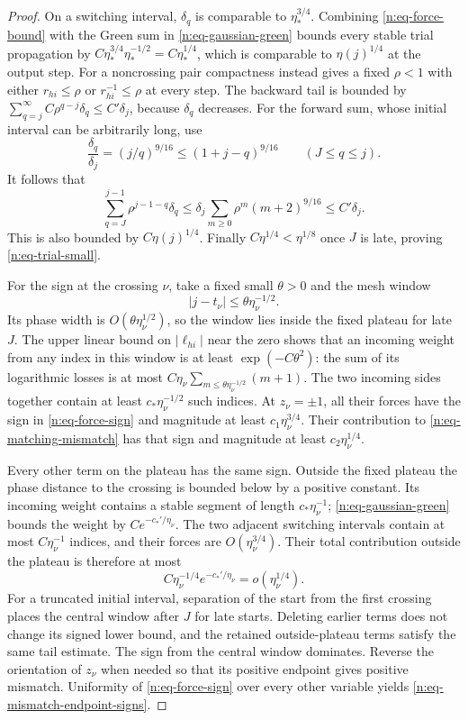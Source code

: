 \begin{proof}
On a switching interval, \(\delta_q\) is comparable to
\(\eta_*^{3/4}\).  Combining \eqref{n:eq-force-bound} with the Green sum
in \eqref{n:eq-gaussian-green} bounds every stable trial propagation by
\(C\eta_*^{3/4}\eta_*^{-1/2}=C\eta_*^{1/4}\), which is comparable to
\(\eta(j)^{1/4}\) at the output step.
For a noncrossing pair compactness instead gives a fixed \(\rho<1\) with
either \(r_{hi}\leq\rho\) or \(r_{hi}^{-1}\leq\rho\) at every step.
The backward tail is bounded by
\(\sum_{q=j}^{\infty}C\rho^{q-j}\delta_q\leq C'\delta_j\), because
\(\delta_q\) decreases.  For the forward sum, whose initial interval can
be arbitrarily long, use
\[
 \frac{\delta_q}{\delta_j}=(j/q)^{9/16}
 \leq(1+j-q)^{9/16}\qquad(J\leq q\leq j).
\]
It follows that
\[
 \sum_{q=J}^{j-1}\rho^{j-1-q}\delta_q
 \leq\delta_j\sum_{m\geq0}\rho^m(m+2)^{9/16}
 \leq C'\delta_j.
\]
This is also bounded by \(C\eta(j)^{1/4}\).
Finally \(C\eta^{1/4}<\eta^{1/8}\) once \(J\) is late, proving
\eqref{n:eq-trial-small}.

For the sign at the crossing \(\nu\), take a fixed small \(\theta>0\) and
the mesh window
\[
 |j-t_\nu|\leq\theta\eta_\nu^{-1/2}.
\]
Its phase width is \(O(\theta\eta_\nu^{1/2})\), so the window lies inside
the fixed plateau for late \(J\).  The upper linear bound on
\(|\ell_{hi}|\) near the zero shows that an incoming weight from any
index in this window is at least \(\exp(-C\theta^2)\): the sum of its
logarithmic losses is at most \(C\eta_\nu\sum_{m\leq
\theta\eta_\nu^{-1/2}}(m+1)\).  The two incoming sides together contain
at least \(c_*\eta_\nu^{-1/2}\) such indices.  At \(z_\nu=\pm1\), all their
forces have the sign in \eqref{n:eq-force-sign} and magnitude at least
\(c_1\eta_\nu^{3/4}\).  Their contribution to
\eqref{n:eq-matching-mismatch} has that sign and magnitude at least
\(c_2\eta_\nu^{1/4}\).

Every other term on the plateau has the same sign.  Outside the fixed
plateau the phase distance to the crossing is bounded below by a positive
constant.  Its incoming weight contains a stable segment of length
\(c_*\eta_\nu^{-1}\); \eqref{n:eq-gaussian-green} bounds the weight by
\(C e^{-c_*'/\eta_\nu}\).  The two adjacent switching intervals contain at
most \(C\eta_\nu^{-1}\) indices, and their forces are
\(O(\eta_\nu^{3/4})\).  Their total contribution outside the plateau is
therefore at most
\[
 C\eta_\nu^{-1/4}e^{-c_*'/\eta_\nu}
   =o(\eta_\nu^{1/4}).
\]
For a truncated initial interval, separation of the start from the first
crossing places the central window after \(J\) for late starts.  Deleting
earlier terms does not change its signed lower bound, and the retained
outside-plateau terms satisfy the same tail estimate.  The sign from the
central window dominates.  Reverse the orientation of \(z_\nu\) when
needed so that its positive endpoint gives positive mismatch.  Uniformity
of \eqref{n:eq-force-sign} over every other variable yields
\eqref{n:eq-mismatch-endpoint-signs}.
\end{proof}

